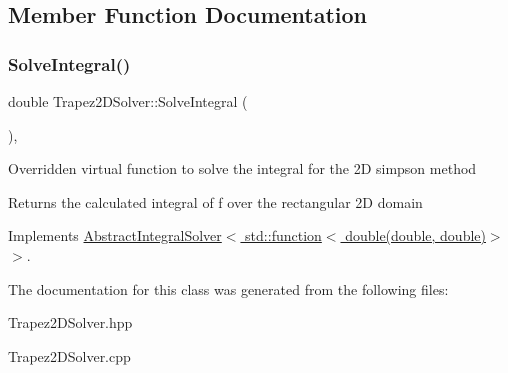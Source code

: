 \subsection{Member Function Documentation}
\mbox{\label{class_trapez2_d_solver_a88f724ff6fd2c566d54f5d0ccc500cb9}} 
\subsubsection{\texorpdfstring{Solve\+Integral()}{SolveIntegral()}}
{\footnotesize\ttfamily double Trapez2\+D\+Solver\+::\+Solve\+Integral (\begin{DoxyParamCaption}{ }\end{DoxyParamCaption})\hspace{0.3cm}{\ttfamily [override]}, {\ttfamily [virtual]}}

Overridden virtual function to solve the integral for the 2D simpson method \begin{DoxyReturn}{Returns}
the calculated integral of f over the rectangular 2D domain 
\end{DoxyReturn}


Implements \hyperlink{class_abstract_integral_solver_ad87cb44c5ef3122bc95be48f473ba399}{Abstract\+Integral\+Solver$<$ std\+::function$<$ double(double, double)$>$ $>$}.



The documentation for this class was generated from the following files\+:\begin{DoxyCompactItemize}
\item 
Trapez2\+D\+Solver.\+hpp\item 
Trapez2\+D\+Solver.\+cpp\end{DoxyCompactItemize}
